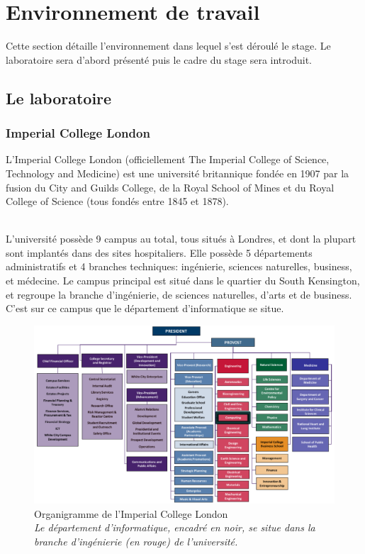 \documentclass[10pt]{report}
\begin{document}
\chapter{Environnement de travail} 
	Cette section détaille l'environnement dans lequel s'est déroulé le stage. Le laboratoire sera d'abord présenté puis le cadre du stage sera introduit.
	\section{Le laboratoire}
	
	\subsection{Imperial College London} 
	L’Imperial College London (officiellement The Imperial College of Science, Technology and Medicine) est une université britannique fondée en 1907 par la fusion du City and Guilds College, de la Royal School of Mines et du Royal College of Science (tous fondés entre 1845 et 1878).\\ ~\par
    L'université possède 9 campus au total, tous situés à Londres, et dont la plupart sont implantés dans des sites hospitaliers.  
    Elle possède 5 départements administratifs et 4 branches techniques: ingénierie, sciences naturelles, business, et médecine.	Le campus principal est situé dans le quartier du South Kensington, et regroupe la branche d'ingénierie, de sciences naturelles, d'arts et de business. C'est sur ce campus que le département d'informatique se situe. 
    
	\begin{figure}[h!]
		\begin{center}
			\includegraphics[width=17cm]{Reports/figures/College-Organisation.pdf}
		\end{center}
		\caption[Organigramme de l'Imperial College London]{Organigramme de l'Imperial College London \\ \textit{Le département d'informatique, encadré en noir, se situe dans la branche d'ingénierie (en rouge) de l'université.}}
		\label{Organigramme de l'Imperial College London}
	\end{figure}
	
\end{document}
